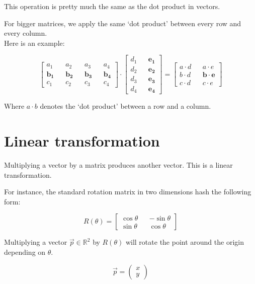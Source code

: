 \documentclass{article}
\begin{document}
This operation is pretty much the same as the dot product in vectors.

For bigger matrices, we apply the same `dot product' between every row and every column. \\
Here is an example:

\[
    \begin{bmatrix} 
        a_1 && a_2 && a_3 && a_4 \\
        \mathbf{b_1} && \mathbf{b_2} && \mathbf{b_3} && \mathbf{b_4} \\
        c_1 && c_2 && c_3 && c_4
    \end{bmatrix}
    \cdot
    \begin{bmatrix} 
        d_1 && \mathbf{e_1} \\
        d_2 && \mathbf{e_2} \\
        d_3 && \mathbf{e_3} \\
        d_4 && \mathbf{e_4}
    \end{bmatrix}
    =
    \begin{bmatrix} 
        a \cdot d && a \cdot e \\
        b \cdot d && \mathbf{b \cdot e} \\
        c \cdot d && c \cdot e
    \end{bmatrix}
\]

Where \(a \cdot b\) denotes the `dot product' between a row and a column.

\pagebreak

\section{Linear transformation}

Multiplying a vector by a matrix produces another vector. This is a linear transformation.

For instance, the standard rotation matrix in two dimensions hash the following form:

\[
    R(\theta)=
    \begin{bmatrix} 
        \cos\theta && -\sin\theta \\
        \sin\theta && \cos\theta
    \end{bmatrix}
\]

Multiplying a vector \(\vec{p}\in \mathbb{R}^2\) by \(R(\theta)\) will rotate the point around the origin depending on \(\theta\).

\[
    \vec{p}=
    \begin{pmatrix} 
        x \\
        y
    \end{pmatrix}
\]
\end{document}
